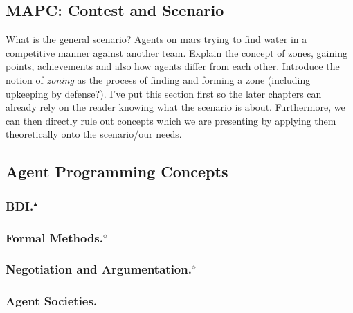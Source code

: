 \subsection{MAPC: Contest and Scenario}
What is the general scenario? Agents on mars trying to find water in a competitive manner against another team. Explain the concept of zones, gaining points, achievements and also how agents differ from each other. Introduce the notion of \emph{zoning} as the process of finding and forming a zone (including upkeeping by defense?).
I've put this section first so the later chapters can already rely on the reader knowing what the scenario is about. Furthermore, we can then directly rule out concepts which we are presenting by applying them theoretically onto the scenario/our needs.

\subsection{Agent Programming Concepts}
\subsubsection[BDI.]{BDI.$^\blacktriangle$}


\subsubsection[Formal Methods.]{Formal Methods.$^\diamond$}


\subsubsection[Negotiation and Argumentation.]{Negotiation and Argumentation.$^\diamond$}


\subsubsection{Agent Societies.}

